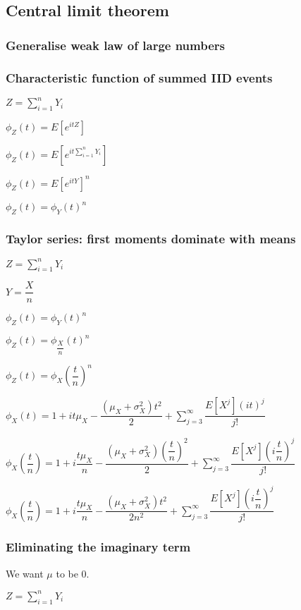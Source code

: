 
\subsection{Central limit theorem}

\subsubsection{Generalise weak law of large numbers}

\subsubsection{Characteristic function of summed IID events}

\(Z=\sum_{i=1}^nY_i\)

\(\phi_Z(t)=E[e^{itZ}]\)

\(\phi_Z(t)=E[e^{it\sum_{i=1}^nY_i}]\)

\(\phi_Z(t)=E[e^{itY}]^n\)

\(\phi_Z(t)=\phi_Y(t)^n\)

\subsubsection{Taylor series: first moments dominate with means}

\(Z=\sum_{i=1}^nY_i\)

\(Y=\dfrac{X}{n}\)

\(\phi_Z(t)=\phi_Y(t)^n\)

\(\phi_Z(t)=\phi_{\dfrac{X}{n}}(t)^n\)

\(\phi_Z(t)=\phi_X(\dfrac{t}{n})^n\)

\(\phi_X(t)=1+it\mu_X -\dfrac{(\mu_X +\sigma_X^2 )t^2}{2} +\sum_{j=3}^{\infty }\dfrac{E[X^j](it)^j}{j!}\)

\(\phi_X(\dfrac{t}{n})=1+i\dfrac{t\mu_X }{n}-\dfrac{(\mu_X +\sigma_X^2 )(\dfrac{t}{n})^2}{2} +\sum_{j=3}^{\infty }\dfrac{E[X^j](i\dfrac{t}{n})^j}{j!}\)

\(\phi_X(\dfrac{t}{n})=1+i\dfrac{t\mu_X }{n}-\dfrac{(\mu_X +\sigma_X^2 )t^2}{2n^2} +\sum_{j=3}^{\infty }\dfrac{E[X^j](i\dfrac{t}{n})^j}{j!}\)

\subsubsection{Eliminating the imaginary term}

We want \(\mu \) to be \(0\).

\(Z=\sum_{i=1}^nY_i\)

